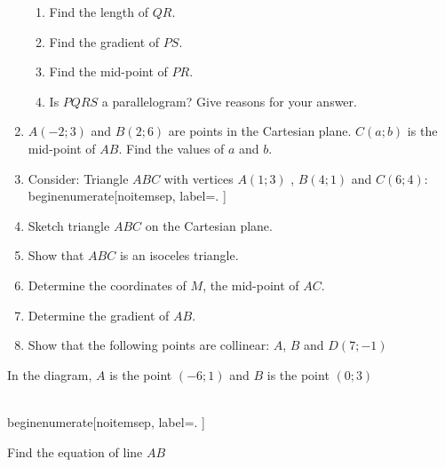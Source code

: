 \begin{eocexercises}{}
\begin{enumerate}[noitemsep, label=\textbf{\arabic*}. ]
\begin{enumerate}[noitemsep, label=\textbf{\alph*}. ] 
\item Find the length of $QR$.
\item Find the gradient of $PS$.
\item Find the mid-point of $PR$.
\item Is $PQRS$ a parallelogram?  Give reasons for your answer.
 \end{enumerate}
\item $A(-2;3)$ and $B(2;6)$ are points in the Cartesian plane. $C(a;b)$ is the mid-point of $AB$. Find the values of $a$ and $b$.
\item 
Consider: Triangle $ABC$ with vertices $A(1; 3)$ , $B(4;1)$ and $C (6; 4)$:
\\begin{enumerate}[noitemsep, label=\textbf{\alph*}. ] 
\item Sketch triangle $ABC$ on the Cartesian plane. 
\item Show that $ABC$ is an isoceles triangle.
\item Determine the coordinates of $M$, the mid-point of $AC$.
\item Determine the gradient of $AB$.
\item Show that the following points are collinear: $A$, $B$ and $D(7;-1)$
\end{enumerate}
\item In the diagram, $A$ is the point $(-6;1)$ and $B$ is the point $(0;3)$
\setcounter{subfigure}{0}
\begin{figure}[H] %
\begin{center}
\end{center}
\end{figure} 
\\begin{enumerate}[noitemsep, label=\textbf{\alph*}. ] 
\item Find the equation of line $AB$ 

\end{eocexercises}
